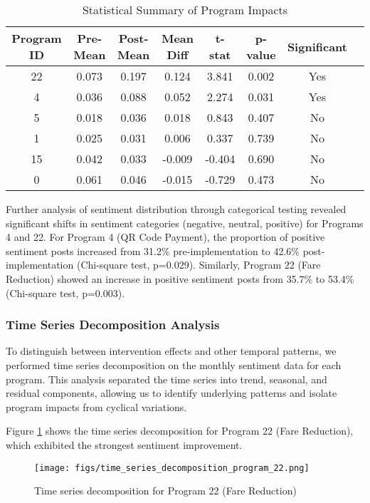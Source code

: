 \documentclass[a4paper,fleqn,12pt]{cas-sc}
\begin{document}
\begin{table}[h]
\centering
\caption{Statistical Summary of Program Impacts}
\label{tab:stats_summary}
\begin{tabular}{cccccccc}
\hline
Program ID & Pre-Mean & Post-Mean & Mean Diff & t-stat & p-value & Significant \\
\hline
22 & 0.073 & 0.197 & 0.124 & 3.841 & 0.002 & Yes \\
4 & 0.036 & 0.088 & 0.052 & 2.274 & 0.031 & Yes \\
5 & 0.018 & 0.036 & 0.018 & 0.843 & 0.407 & No \\
1 & 0.025 & 0.031 & 0.006 & 0.337 & 0.739 & No \\
15 & 0.042 & 0.033 & -0.009 & -0.404 & 0.690 & No \\
0 & 0.061 & 0.046 & -0.015 & -0.729 & 0.473 & No \\
\hline
\end{tabular}
\end{table}

Further analysis of sentiment distribution through categorical testing revealed significant shifts in sentiment categories (negative, neutral, positive) for Programs 4 and 22. For Program 4 (QR Code Payment), the proportion of positive sentiment posts increased from 31.2\% pre-implementation to 42.6\% post-implementation (Chi-square test, p=0.029). Similarly, Program 22 (Fare Reduction) showed an increase in positive sentiment posts from 35.7\% to 53.4\% (Chi-square test, p=0.003).

\subsubsection{Time Series Decomposition Analysis}

To distinguish between intervention effects and other temporal patterns, we performed time series decomposition on the monthly sentiment data for each program. This analysis separated the time series into trend, seasonal, and residual components, allowing us to identify underlying patterns and isolate program impacts from cyclical variations.

Figure \ref{fig:time_series_decomposition} shows the time series decomposition for Program 22 (Fare Reduction), which exhibited the strongest sentiment improvement.

\begin{figure}[h]
\centering
\texttt{[image: figs/time\_series\_decomposition\_program\_22.png]}
\caption{Time series decomposition for Program 22 (Fare Reduction)}
\label{fig:time_series_decomposition}
\end{figure}
\end{document}
